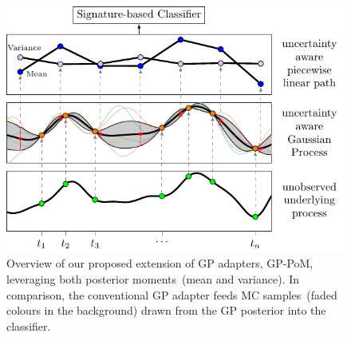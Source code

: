 \documentclass{article}
\begin{document}
\begin{figure}[t]
    \centering
    \hspace*{1cm}
    \includegraphics[width=0.7\columnwidth]{figures/overview.pdf}
    \caption{%
      Overview of our proposed extension of GP adapters, GP-PoM,
      leveraging both posterior moments~(mean and variance). In
      comparison, the conventional GP adapter feeds MC samples~(faded
      colours in the background) drawn from the GP posterior into the
      classifier.
    }
    \label{fig:overview}
\end{figure}
\end{document}
